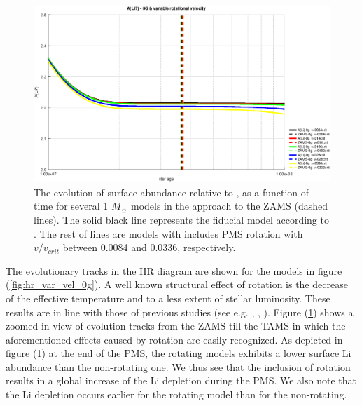 \documentclass[fleqn,usenatbib]{mnras}
\begin{document}
\begin{figure}
	\includegraphics[width=\columnwidth]{figures/li_var_vel_0_0g_z1.eps}
    \caption {The evolution of surface  abundance relative to , as a function of time for several 1 $M_{\sun}$ models in the approach to the ZAMS (dashed lines). The solid black line represents the fiducial model according to \citet{Choi2016}. The rest of lines are models with includes PMS rotation with $v/v_{crit}$ between 0.0084 and 0.0336, respectively.}
    \label{fig:li_var_vel_0g_z1}
\end{figure}


The evolutionary tracks in the HR diagram are shown for the models in figure (\ref{fig:hr_var_vel_0g}). A well known structural effect of rotation is the decrease of the effective temperature and to a less extent of stellar luminosity. These results are in line with those of previous studies (see e.g. \citet{Eggenberger2012}, \citet{Piau2001}, \citet{Pinsonneault1989}). Figure (\ref{fig:li_var_vel_0g_z1}) shows a zoomed-in view of evolution tracks from the ZAMS till the TAMS in which the aforementioned effects caused by rotation are easily recognized. As depicted in figure (\ref{fig:li_var_vel_0g_z1}) at the end of the PMS, the rotating models exhibits a lower surface Li abundance than the non-rotating one. We thus see that the inclusion of rotation results in a global increase of the Li depletion during the PMS. We also note that the Li depletion occurs earlier for the rotating model than for the non-rotating.\par
\end{document}
